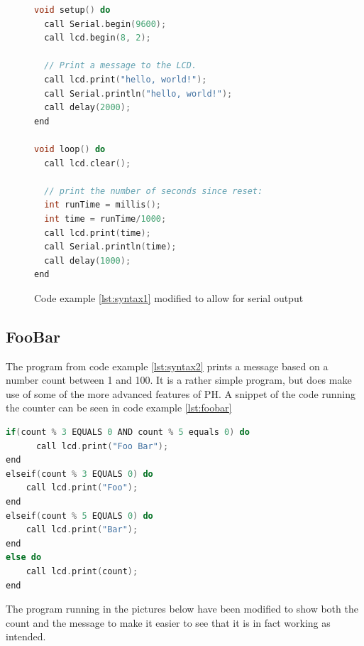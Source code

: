 \begin{figure}[h!]
\begin{lstlisting}[caption=Hello World with serial output, language={C++},label=lst:serial]
void setup() do
  call Serial.begin(9600);
  call lcd.begin(8, 2);

  // Print a message to the LCD.
  call lcd.print("hello, world!");
  call Serial.println("hello, world!");
  call delay(2000);
end

void loop() do
  call lcd.clear();

  // print the number of seconds since reset:
  int runTime = millis();
  int time = runTime/1000;
  call lcd.print(time);
  call Serial.println(time);
  call delay(1000);
end
\end{lstlisting}
\caption{Code example \ref{lst:syntax1} modified to allow for serial output}
\end{figure}

\subsection*{FooBar}
The program from code example \ref{lst:syntax2} prints a message based on a number count between 1 and 100. It is a rather simple program, but does make use of some of the more advanced features of PH. A snippet of the code running the counter can be seen in code example \ref{lst:foobar}
\begin{lstlisting}[caption=Hello World with serial output,firstnumber=26, language={C++},label=lst:foobar]
if(count % 3 EQUALS 0 AND count % 5 equals 0) do
      call lcd.print("Foo Bar"); 
end
elseif(count % 3 EQUALS 0) do
    call lcd.print("Foo");
end
elseif(count % 5 EQUALS 0) do
    call lcd.print("Bar");
end
else do
    call lcd.print(count);
end
\end{lstlisting}

The program running in the pictures below have been modified to show both the count and the message to make it easier to see that it is in fact working as intended.

